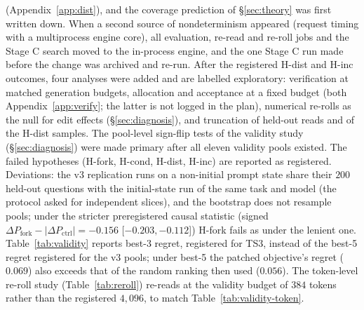 (Appendix~\ref{app:dist}), and the coverage prediction of \S\ref{sec:theory} was first written down.
When a second source of nondeterminism appeared (request timing with a
multiprocess engine core), all evaluation, re-read and re-roll jobs and the Stage C search moved to
the in-process engine, and the one Stage C run made before the change was archived and re-run.
After the registered H-dist and H-inc outcomes, four analyses were added and are labelled
exploratory: verification at matched generation budgets, allocation and acceptance at a fixed
budget (both Appendix~\ref{app:verify}; the latter is not logged in the plan), numerical re-rolls as
the null for edit effects (\S\ref{sec:diagnosis}), and truncation of held-out reads and of the
H-dist samples. The pool-level sign-flip tests of the validity study (\S\ref{sec:diagnosis}) were
made primary after all eleven validity pools existed. The failed hypotheses (H-fork, H-cond, H-dist, H-inc) are reported as
registered.
Deviations: the v3 replication runs on a non-initial prompt state share their $200$ held-out
questions with the initial-state run of the same task and model (the protocol asked for
independent slices), and the bootstrap does not resample pools; under the stricter preregistered
causal statistic (signed $\Delta P_{\text{fork}}-|\Delta P_{\text{ctrl}}|=-0.156$
[$-0.203,-0.112$]) H-fork fails as under the lenient one. Table~\ref{tab:validity} reports best-3
regret, registered for TS3, instead of the best-5 regret registered for the v3 pools; under best-5
the patched objective's regret ($0.069$) also exceeds that of the random ranking then used
($0.056$). The token-level re-roll study (Table~\ref{tab:reroll}) re-reads at the validity budget of
$384$ tokens rather than the registered $4{,}096$, to match Table~\ref{tab:validity-token}.


